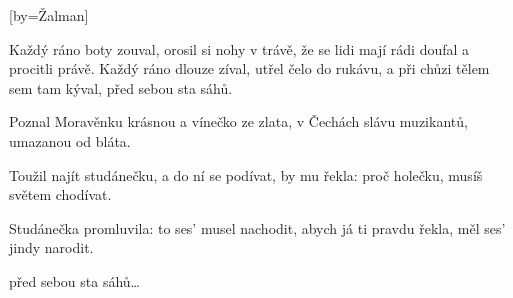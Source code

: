 [by={Žalman}]

\beginchorus{}
Každý ráno boty zouval, orosil si nohy v trávě,
že se lidi mají rádi doufal a procitli právě.
Každý ráno dlouze zíval, utřel čelo do rukávu,
a při chůzi tělem sem tam kýval, před sebou sta sáhů.
\endchorus{}

\beginverse{}
Poznal Moravěnku krásnou a vínečko ze zlata,
v Čechách slávu muzikantů, umazanou od bláta.
\endverse{}

\beginchorus{}

\endchorus{}

\beginverse{}
Toužil najít studánečku, a do ní se podívat,
by mu řekla: proč holečku, musíš světem chodívat.
\endverse{}

\beginverse{}
Studánečka promluvila: to ses' musel nachodit,
abych já ti pravdu řekla, měl ses' jindy narodit.
\endverse{}

\beginchorus{}

\lrep{} před sebou sta sáhů\ldots{} \rrep{}
\endchorus{}

\endsong{}
